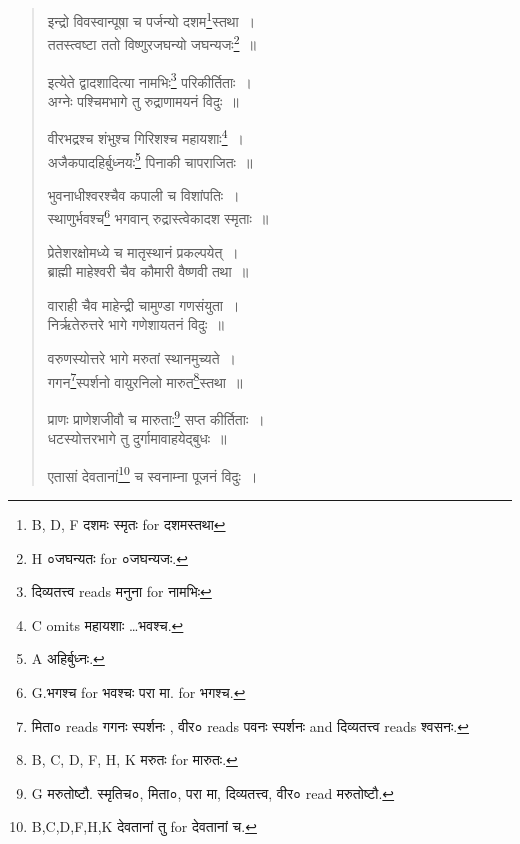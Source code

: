 \documentclass[11pt, openany]{book}
\begin{document}
\begin{quote}
{\vy इन्द्रो विवस्वान्पूषा च पर्जन्यो दशम\renewcommand{\thefootnote}{1}\footnote{B, D, F दशमः स्मृतः for दशमस्तथा}स्तथा~।\\
ततस्त्वष्टा ततो विष्णुरजघन्यो जघन्यजः\renewcommand{\thefootnote}{2}\footnote{H ०जघन्यतः for ०जघन्यजः.}~॥

इत्येते द्वादशादित्या नामभिः\renewcommand{\thefootnote}{3}\footnote{दिव्यतत्त्व reads मनुना for नामभिः} परिकीर्तिताः~।\\
अग्नेः पश्चिमभागे तु रुद्राणामयनं विदुः~॥

वीरभद्रश्च शंभुश्च गिरिशश्च महायशाः\renewcommand{\thefootnote}{4}\footnote{C omits महायशाः \ldots भवश्च.}~।\\
अजैकपादहिर्बुध्नयः\renewcommand{\thefootnote}{5}\footnote{A अहिर्बुध्नः.} पिनाकी चापराजितः~॥

भुवनाधीश्वरश्चैव कपाली च विशांपतिः~।\\
स्थाणुर्भवश्च\renewcommand{\thefootnote}{6}\footnote{G.भगश्च for भवश्चः परा मा. for भगश्च.} भगवान् रुद्रास्त्वेकादश स्मृताः~॥

प्रेतेशरक्षोमध्ये च मातृस्थानं प्रकल्पयेत्~।\\
ब्राह्मी माहेश्वरी चैव कौमारी वैष्णवी तथा~॥

वाराही चैव माहेन्द्री चामुण्डा गणसंयुता~।\\
निर्ऋतेरुत्तरे भागे गणेशायतनं विदुः~॥

वरुणस्योत्तरे भागे मरुतां स्थानमुच्यते~।\\
गगन\renewcommand{\thefootnote}{7}\footnote{मिता० reads गगनः स्पर्शनः , वीर० reads पवनः स्पर्शनः and दिव्यतत्त्व reads श्वसनः.}स्पर्शनो वायुरनिलो मारुत\renewcommand{\thefootnote}{8}\footnote{B, C, D, F, H, K मरुतः for मारुतः.}स्तथा~॥

प्राणः प्राणेशजीवौ च मारुताः\renewcommand{\thefootnote}{9}\footnote{G मरुतोष्टौ. स्मृतिच०, मिता०, परा मा, दिव्यतत्त्व, वीर० read मरुतोष्टौ.} सप्त कीर्तिताः~।\\
धटस्योत्तरभागे तु दुर्गामावाहयेद्बुधः~॥

एतासां देवतानां\renewcommand{\thefootnote}{10}\footnote{B,C,D,F,H,K देवतानां तु for देवतानां च.} च स्वनाम्ना पूजनं विदुः~।}
\end{quote}

\newpage
{}
\end{document}
